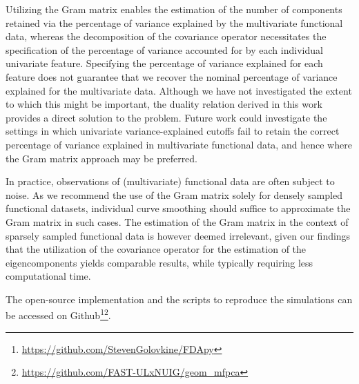 Utilizing the Gram matrix enables the estimation of the number of components retained via the percentage of variance explained by the multivariate functional data, whereas the decomposition of the covariance operator necessitates the specification of the percentage of variance accounted for by each individual univariate feature. Specifying the percentage of variance explained for each feature does not guarantee that we recover the nominal percentage of variance explained for the multivariate data. Although we have not investigated the extent to which this might be important, the duality relation derived in this work provides a direct solution to the problem. Future work could investigate the settings in which univariate variance-explained cutoffs fail to retain the correct percentage of variance explained in multivariate functional data, and hence where the Gram matrix approach may be preferred.

In practice, observations of (multivariate) functional data are often subject to noise. As we recommend the use of the Gram matrix solely for densely sampled functional datasets, individual curve smoothing should suffice to approximate the Gram matrix in such cases. The estimation of the Gram matrix in the context of sparsely sampled functional data is however deemed irrelevant, given our findings that the utilization of the covariance operator for the estimation of the eigencomponents yields comparable results, while typically requiring less computational time.

The open-source implementation and the scripts to reproduce the simulations can be accessed on Github\footnote{\url{https://github.com/StevenGolovkine/FDApy}}\footnote{\url{https://github.com/FAST-ULxNUIG/geom_mfpca}}.


